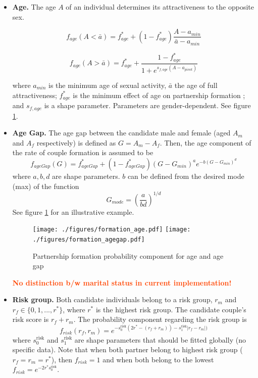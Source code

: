 \documentclass[11pt, onecolumn]{article}
\newcommand{\warning}[1]{\textbf{\textcolor{OrangeRed}{#1}}}
\begin{document}
\begin{itemize}

\item \textbf{Age.} The age $A$ of an individual determines its attractiveness to the opposite sex. 

$$ f_{age}(A < \bar{a})  = f_{age}^* + (1-f_{age}^*)\frac{A - a_{min}}{\bar{a} - a_{min}} $$

$$ f_{age}(A > \bar{a})  =  f_{age}^* + \frac{1-f_{age}^*}{1+e^{s_{f,age}(A-a_{pivot})}}   $$

where $a_{min}$ is the minimum age of sexual activity, $\bar{a}$ the age of full attractiveness; $ f_{age}^*$ is the minimum effect of age on partnership formation ; and $s_{f,age}$ is a shape parameter. Parameters are gender-dependent. See figure \ref{fig:formationAge}.


\item \textbf{Age Gap.} 
The age gap between the candidate male and female  (aged $A_m$ and $A_f$ respectively)  is defined as $G=A_m-A_f$. Then, the age component of the rate of couple formation is assumed to be
$$f_{ageGap}(G) = f_{ageGap}^* + (1-f_{ageGap}^*) (G-G_{min})^a e^{-b(G-G_{min})^d}$$
where $a,b,d$ are shape parameters. $b$ can be defined from the desired mode (max) of the function
$$G_{mode} = \left(\frac{a}{bd}\right)^{1/d}$$
See figure \ref{fig:formationAge} for an illustrative example.

\begin{figure}[ht]
\centering
    \texttt{[image: ./figures/formation\_age.pdf]}
    \texttt{[image: ./figures/formation\_agegap.pdf]}
\caption{Partnership formation probability component for age and age gap}
\label{fig:formationAge}
\end{figure}

\warning{No distinction b/w marital status in current implementation!}

\item \textbf{Risk group.} Both candidate individuals belong to a risk group, $r_m$ and $r_f\in \{0,1,...,r^*\}$, where $r^*$ is the highest risk group. The candidate couple's risk score is $r_f+r_m$. The probability component regarding the risk group is
$$f_{risk}(r_f,r_m) = e^{-s^{\mathrm{risk}}_0(2r^*-(r_f+r_m))-s^{\mathrm{risk}}_1 |r_f-r_m|)}$$
where $s^{\mathrm{risk}}_0$ and $s^{\mathrm{risk}}_1$ are shape parameters that should be fitted globally (no specific data). Note that when both partner belong to highest risk group ($r_f=r_m=r^*$), then $f_{risk}=1$ and when both belong to the lowest $f_{risk}=e^{-2r^*s^{\mathrm{risk}}_0}$.


\end{itemize}
\end{document}
